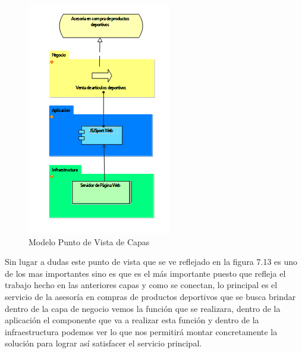 \begin{figure}[th!]
	\centering
	\includegraphics[width=0.7\linewidth]{arquitectura/imagenes/PuntoVistaCapas}
	\caption{Modelo Punto de Vista de Capas}
	\label{modeloCapas}
\end{figure}

Sin lugar a dudas este punto de vista que se ve reflejado en la figura 7.13 es uno de los mas importantes sino es que es el más importante puesto que refleja el trabajo hecho en las anteriores capas y como se conectan, lo principal es el servicio de la asesoría en compras de productos deportivos que se busca brindar dentro de la capa de negocio vemos la función que se realizara, dentro de la aplicación el componente que va a realizar esta función y dentro de la infraestructura podemos ver lo que nos permitirá montar concretamente la solución para lograr así satisfacer el servicio principal.

\newpage

